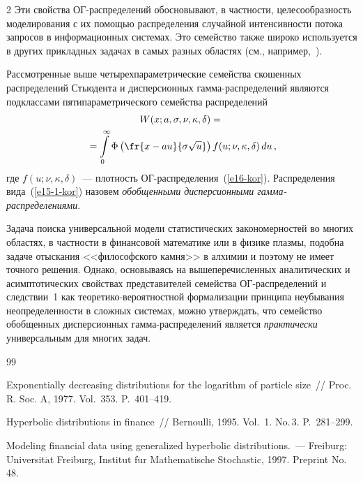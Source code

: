 \begin{multicols}{2}
Эти свойства ОГ-рас\-пре\-де\-ле\-ний обосновывают, в част\-ности,
целесообразность моделирования с их помощью распределения
случайной интен\-сив\-ности потока запросов в информационных сис\-те\-мах.
Это семейство также широко используется в других прикладных
задачах в самых разных областях (см., например,~\cite{KorolevShorgin2011}).

Рассмотренные выше четырехпараметрические семейства скошенных
распределений Стьюдента и дисперсионных гамма-распределений
являются подклассами пятипараметрического семейства распределений
\begin{multline}
W(x;a,\sigma,\nu,\kappa,\delta)={}\\
{}=
\int\limits_{0}^{\infty}\Phi\left(\fr{x-au}{\sigma\sqrt{u}}\right)
f(u;\nu,\kappa,\delta)\,du\,,\label{e15-1-kor}
\end{multline}
где $f(u;\nu,\kappa,\delta)$~--- плотность ОГ-рас\-пре\-де\-ле\-ния~(\ref{e16-kor}).
Распределения вида~(\ref{e15-1-kor}) назовем \textit{обобщенными дисперсионными
гам\-ма-рас\-пре\-де\-ле\-ни\-ями}.

Задача поиска универсальной модели статистических закономерностей
во многих областях, в частности в финансовой математике или в
физике плазмы, подобна задаче отыскания <<философского камня>> в
алхимии и поэтому не имеет точного решения. Однако, основываясь на
вышепере\-чис\-ленных аналитических и асимптотических свойствах
представителей семейства ОГ-рас\-пре\-де\-ле\-ний и следствии~1 как
тео\-ре\-ти\-ко-ве\-ро\-ят\-но\-ст\-ной формализации принципа неубывания
не\-опре\-де\-лен\-ности в сложных сис\-те\-мах, можно утверждать, что
семейство обобщенных дисперсионных гам\-ма-рас\-пре\-де\-ле\-ний является
\textit{практически} универсальным для многих задач.

{\small\frenchspacing
{%
\begin{thebibliography}{99}


Exponentially decreasing distributions for
the logarithm of particle size~// Proc. R. Soc. A, 1977. Vol.~353.
P.~401--419.

Hyperbolic distributions in finance~// Bernoulli, 1995. Vol.~1. No.\,3.
P.~281--299.

 Modeling financial data using generalized hyperbolic
distri\-butions.~--- Freiburg: Universit$\ddot{\mbox{a}}$t Freiburg, Institut
f$\ddot{\mbox{u}}$r Mathematische Stochastic, 1997. Preprint No.\,48.


\end{thebibliography}}}
\end{multicols}
